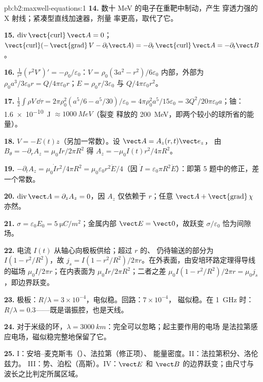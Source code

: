 \begin{solution}{pb:b2:maxwell-equations:1}
\textbf{14.} 数十 MeV 的电子在重靶中制动，产生
穿透力强的 X 射线；紧凑型直线加速器，剂量
率更高，取代了它。

\textbf{15.} $\operatorname{div}\operatorname{\vect{curl}}\vect A = 0$；$\operatorname{\vect{curl}}(-\operatorname{\vect{grad}}
V - \partial_t\vect A) = -\partial_t\operatorname{\vect{curl}}\vect A = -\partial_t\vect B$。

\textbf{16.} $\frac1{r^2}(r^2V')' = -\rho_0/\varepsilon_0$：$V = \rho_0(3a^2 - r^2)/6\varepsilon_0$
内部，外部为 $\rho_0a^3/3\varepsilon_0r = Q/4\pi\varepsilon_0r$；$E = \rho_0r/3\varepsilon_0$ 与
$Q/4\pi\varepsilon_0r^2$。

\textbf{17.} $\tfrac12\int\rho V\,\dd\tau = 2\pi\rho_0^2(a^5/6 - a^5/30)/\varepsilon_0 = 4\pi\rho_0^2a^5/
15\varepsilon_0 = 3Q^2/20\pi\varepsilon_0a$；铀：\qty{1.6e-10}{J} $\approx \qty{1000}{MeV}$（裂变
释放的 \qty{200}{MeV}，即两个较小的球所省的能量）。

\textbf{18.} $V = -E(t)z$（另加一常数）。设 $\vect A = A_z(r, t)\vect e_z$，
由 $B_\theta = -\partial_rA_z = \mu_0Ir/2\pi R^2$ 得 $A_z = -\mu_0I(t)r^2/4\pi R^2$。

\textbf{19.} $-\partial_tA_z = \mu_0\dot Ir^2/4\pi R^2 = \mu_0\varepsilon_0r^2\ddot E/4$（因 $\dot I =
\varepsilon_0\pi R^2\ddot E$）：即第 5 题中的修正，差一个常数。

\textbf{20.} $\operatorname{div}\vect A = \partial_zA_z = 0$，因 $A_z$
仅依赖于 $r$；任意 $\vect A + \operatorname{\vect{grad}}\chi$ 亦然。

\textbf{21.} $\sigma = \varepsilon_0E_0 = \qty{5}{\micro C/m^2}$；金属内部 $\vect E =
\vect 0$，故跃变 $\sigma/\varepsilon_0$ 恰为间隙场。

\textbf{22.} 电流 $I(t)$ 从轴心向极板供给；超过 $r$ 的、
仍待输送的部分为 $I(1 - r^2/R^2)$，故 $j_s = I(1 -
r^2/R^2)/2\pi r$。在外表面，由安培环路定理得导线的磁场 $\mu_0I/
2\pi r$；在内表面为 $\mu_0Ir/2\pi R^2$；二者之差 $\mu_0I(1 -
r^2/R^2)/2\pi r = \mu_0j_s$，即边界跃变。

\textbf{23.} 极板：$R/\lambda = 3 \times 10^{-4}$，电似稳。回路：$7 \times 10^{-4}$，
磁似稳。在 \qty{1}{GHz} 时：$R/\lambda = 0.3$——既是谐振腔，也是天线。

\textbf{24.} 对于米级的环，$\lambda = \qty{3000}{km}$：完全可以忽略；起主要作用的电场
是法拉第感应电场，磁似稳完整地保留了它。

\textbf{25.} I：安培–麦克斯韦（）、法拉第（修正项）、
能量密度。II：法拉第积分、洛伦兹力。
III：势、泊松（高斯）。IV：$\vect E$
和 $\vect B$ 的边界跃变；由尺寸与波长之比判定所属区域。
\end{solution}
